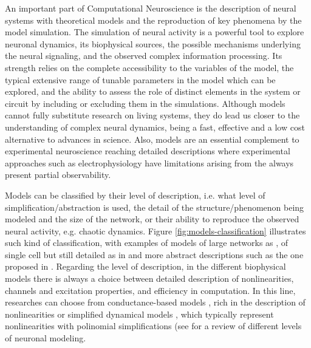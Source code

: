 An important part of Computational Neuroscience is the description of neural systems with theoretical models and the reproduction of key phenomena by the model simulation. The simulation of neural activity is a powerful tool to explore neuronal dynamics, its biophysical sources, the possible mechanisms underlying the neural signaling, and the observed complex information processing. Its strength relies on the complete accessibility to the variables of the model, the typical extensive range of tunable parameters in the model which can be explored,  and the ability to assess the role  of distinct elements in the system or circuit by including or excluding them in the simulations. Although models cannot fully substitute research on living systems, they do lead us closer to the understanding of complex neural dynamics, being a fast, effective and a low cost alternative to advances in science. Also, models are an essential complement to experimental neuroscience reaching detailed descriptions where experimental approaches such as electrophysiology have limitations arising from the always present partial observability. 

Models can be classified by their level of description, i.e. what level of simplification/abstraction is used, the detail of the structure/phenomenon being modeled and the size of the network, or their ability to reproduce the observed neural activity, e.g. chaotic dynamics. Figure \ref{fig:models-classification} illustrates such kind of classification, with examples of models of large networks as \cite{potjans_cell-type_2014,bezaire_interneuronal_2016}, of single cell but still detailed as in \cite{smith_dendritic_2013} and more abstract descriptions such as the one proposed in \cite{izhikevich_simple_2003}. Regarding the level of description, in the different biophysical models there is always a choice between detailed description of nonlinearities, channels and excitation properties, and efficiency in computation. In this line, researches can choose from conductance-based models  \cite{hodgkin_quantitative_1952}, rich in the description of nonlinearities or simplified dynamical models  \cite{hindmarsh_model_1984,fitzhugh_impulses_1961}, which typically represent nonlinearities with polinomial simplifications (see \cite{torres_modeling_2012} for a review of different levels of neuronal modeling. 


